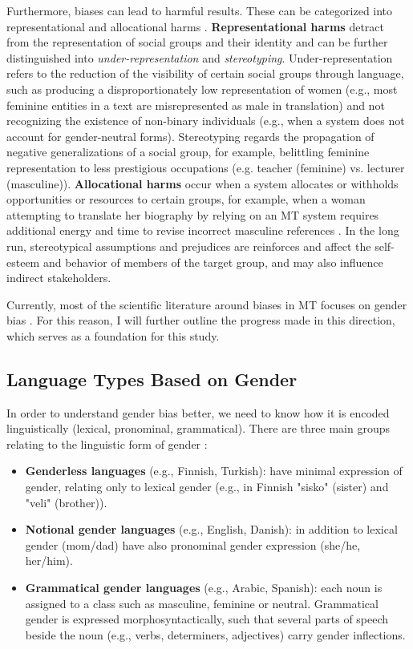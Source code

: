 Furthermore, biases can lead to harmful results. These can be categorized into representational and allocational harms \parencite{Savoldi_2021}. \textbf{Representational harms} detract from the representation of social groups and their identity and can be further distinguished into \textit{under-representation} and \textit{stereotyping}. Under-representation refers to the reduction of the visibility of certain social groups through language, such as producing a disproportionately low representation of women (e.g., most feminine entities in a text are misrepresented as male in translation) and not recognizing the existence of non-binary individuals (e.g., when a system does not account for gender-neutral forms). Stereotyping regards the propagation of negative generalizations of a social group, for example, belittling feminine representation to less prestigious occupations (e.g. teacher (feminine) vs. lecturer (masculine)). \textbf{Allocational harms} occur when a system allocates or withholds opportunities or resources to certain groups, for example, when a woman attempting to translate her biography by relying on an MT system requires additional energy and time to revise incorrect masculine references \parencite{Savoldi_2021}. In the long run, stereotypical assumptions and prejudices are reinforces and affect the self-esteem and behavior of members of the target group, and may also influence indirect stakeholders. 

Currently, most of the scientific literature around biases in MT focuses on gender bias \parencite{Savoldi_2021}. For this reason, I will further outline the progress made in this direction, which serves as a foundation for this study. 

\subsection{Language Types Based on Gender}
\label{sec:Background:Language}
In order to understand gender bias better, we need to know how it is encoded linguistically (lexical, pronominal, grammatical). There are three main groups relating to the linguistic form of gender \parencite{Savoldi_2021}:
\begin{itemize}
    \item \textbf{Genderless languages} (e.g., Finnish, Turkish): have minimal expression of gender, relating only to lexical gender (e.g., in Finnish "sisko" (sister) and "veli" (brother)).
    \item \textbf{Notional gender languages} (e.g., English, Danish): in addition to lexical gender (mom/dad) have also pronominal gender expression (she/he, her/him).
    \item \textbf{Grammatical gender languages} (e.g., Arabic, Spanish): each noun is assigned to a class such as masculine, feminine or neutral. Grammatical gender is expressed morphosyntactically, such that several parts of speech beside the noun (e.g., verbs, determiners, adjectives) carry gender inflections.
\end{itemize}

